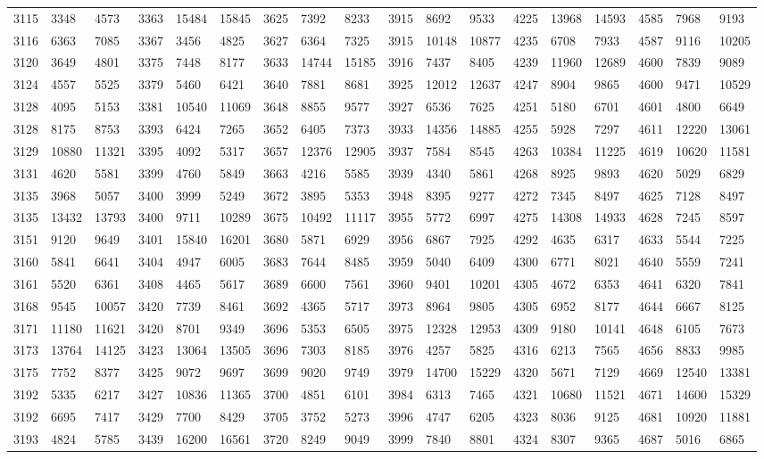 \begin{center}
\begin{longtable}{*5{A@{\hspace*{5mm}}A}}
3115&3348&4573&3363&15484&15845&3625&7392&8233&3915&8692&9533&4225&13968&14593&4585&7968&9193\\
3116&6363&7085&3367&3456&4825&3627&6364&7325&3915&10148&10877&4235&6708&7933&4587&9116&10205\\
3120&3649&4801&3375&7448&8177&3633&14744&15185&3916&7437&8405&4239&11960&12689&4600&7839&9089\\
3124&4557&5525&3379&5460&6421&3640&7881&8681&3925&12012&12637&4247&8904&9865&4600&9471&10529\\
3128&4095&5153&3381&10540&11069&3648&8855&9577&3927&6536&7625&4251&5180&6701&4601&4800&6649\\
3128&8175&8753&3393&6424&7265&3652&6405&7373&3933&14356&14885&4255&5928&7297&4611&12220&13061\\
3129&10880&11321&3395&4092&5317&3657&12376&12905&3937&7584&8545&4263&10384&11225&4619&10620&11581\\
3131&4620&5581&3399&4760&5849&3663&4216&5585&3939&4340&5861&4268&8925&9893&4620&5029&6829\\
3135&3968&5057&3400&3999&5249&3672&3895&5353&3948&8395&9277&4272&7345&8497&4625&7128&8497\\
3135&13432&13793&3400&9711&10289&3675&10492&11117&3955&5772&6997&4275&14308&14933&4628&7245&8597\\
3151&9120&9649&3401&15840&16201&3680&5871&6929&3956&6867&7925&4292&4635&6317&4633&5544&7225\\
3160&5841&6641&3404&4947&6005&3683&7644&8485&3959&5040&6409&4300&6771&8021&4640&5559&7241\\
3161&5520&6361&3408&4465&5617&3689&6600&7561&3960&9401&10201&4305&4672&6353&4641&6320&7841\\
3168&9545&10057&3420&7739&8461&3692&4365&5717&3973&8964&9805&4305&6952&8177&4644&6667&8125\\
3171&11180&11621&3420&8701&9349&3696&5353&6505&3975&12328&12953&4309&9180&10141&4648&6105&7673\\
3173&13764&14125&3423&13064&13505&3696&7303&8185&3976&4257&5825&4316&6213&7565&4656&8833&9985\\
3175&7752&8377&3425&9072&9697&3699&9020&9749&3979&14700&15229&4320&5671&7129&4669&12540&13381\\
3192&5335&6217&3427&10836&11365&3700&4851&6101&3984&6313&7465&4321&10680&11521&4671&14600&15329\\
3192&6695&7417&3429&7700&8429&3705&3752&5273&3996&4747&6205&4323&8036&9125&4681&10920&11881\\
3193&4824&5785&3439&16200&16561&3720&8249&9049&3999&7840&8801&4324&8307&9365&4687&5016&6865\\

\end{longtable}
\end{center}
